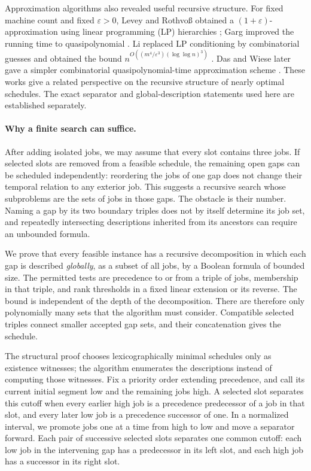 \documentclass[11pt]{article}
\numberwithin{equation}{section}
\theoremstyle{definition}
\theoremstyle{remark}
\begin{document}
Approximation algorithms also revealed useful recursive structure.
For fixed machine count and fixed \(\varepsilon>0\), Levey and Rothvoß
obtained a \((1+\varepsilon)\)-approximation using linear programming
(LP) hierarchies
\citep{LeveyRothvoss2016}; Garg improved the running time to
quasipolynomial \citep{Garg2018}. Li replaced LP conditioning by
combinatorial guesses and obtained the bound
\(n^{O((m^4/\varepsilon^3)(\log\log n)^3)}\) \citep{Li2021}.
Das and Wiese later gave a simpler combinatorial quasipolynomial-time
approximation scheme \citep{DasWiese2022}.
These works give a related perspective on the recursive structure of
nearly optimal schedules. The exact separator and global-description
statements used here are established separately.

\paragraph{Why a finite search can suffice.}
After adding isolated jobs, we may assume that every slot contains three
jobs. If selected slots are removed from a feasible schedule, the remaining
open gaps can be scheduled independently: reordering the jobs of one gap
does not change their temporal relation to any exterior job. This suggests
a recursive search whose subproblems are the sets of jobs in those gaps.
The obstacle is their number. Naming a gap by its two boundary triples
does not by itself determine its job set, and repeatedly intersecting
descriptions inherited from its ancestors can require an unbounded formula.

We prove that every feasible instance has a recursive decomposition in
which each gap is described \emph{globally}, as a subset of all jobs, by a
Boolean formula of bounded size. The permitted tests are precedence to or
from a triple of jobs, membership in that triple, and rank thresholds in
a fixed linear extension or its reverse. The bound is independent of the
depth of the decomposition. There are therefore only polynomially many
sets that the algorithm must consider. Compatible selected triples connect
smaller accepted gap sets, and their concatenation gives the schedule.

The structural proof chooses lexicographically minimal schedules only as
existence witnesses; the algorithm enumerates the descriptions instead of
computing those witnesses. Fix a priority order extending precedence,
and call its current initial segment low and the remaining jobs high.
A selected slot separates this cutoff when every earlier high job is a
precedence predecessor of a job in that slot, and every later low job is
a precedence successor of one. In a normalized interval, we promote
jobs one at a time from high to low and move a separator forward. Each pair
of successive selected slots separates one common cutoff: each low job
in the intervening gap has a predecessor in its left slot, and each high
job has a successor in its right slot.
\end{document}
